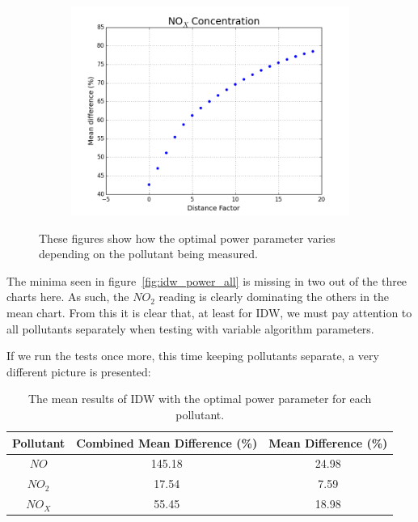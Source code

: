 \begin{figure}[H]
                \begin{subfigure}{0.6\textwidth}
                    \centering
                    \includegraphics[width=\linewidth]{./images/IDW_P_NOx.png}
                    \caption{}
                    \label{fig:idw_power_NOx}
                \end{subfigure}
                \caption{These figures show how the optimal power parameter varies depending on the pollutant being measured.}
                \label{fig:idw_pollutant_compare}
            \end{figure}

            The minima seen in figure~\ref{fig:idw_power_all} is missing in two out of the three charts here. As such, the $NO_{2}$ reading is clearly dominating the others in the mean chart. From this it is clear that, at least for IDW, we must pay attention to all pollutants separately when testing with variable algorithm parameters. 

            If we run the tests once more, this time keeping pollutants separate, a very different picture is presented:

			\begin{table}[H]
				\centering
	    		\begin{tabular}{|c|c|c|}
	    			\hline
					Pollutant & Combined Mean Difference (\%) & Mean Difference (\%) \\ \hline
					$NO$ & 145.18 & 24.98 \\
					$NO_{2}$ & 17.54 & 7.59 \\
					$NO_{X}$ & 55.45 & 18.98 \\
					\hline
				\end{tabular}
				\caption{The mean results of IDW with the optimal power parameter for each pollutant.}
				\label{tab:idw_results_2}
			\end{table} 

